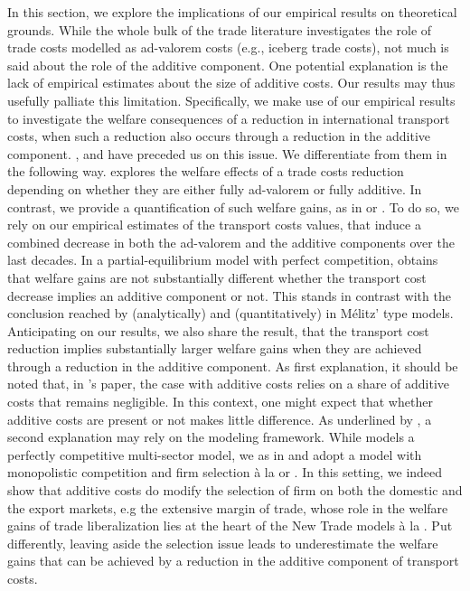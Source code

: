 \documentclass[a4paper,11pt]{article}
\begin{document}
In this section, we explore the implications of our empirical results on theoretical grounds. While the whole bulk of the trade literature investigates the role of trade costs modelled as ad-valorem costs (e.g., iceberg trade costs), not much is said about the role of the additive component. One potential explanation is the lack of empirical estimates about the size of additive costs. Our results may thus usefully palliate this limitation. Specifically, we make use of our empirical results to investigate the welfare consequences of a reduction in international transport costs, when such a reduction also occurs through a reduction in the additive component. \cite{Irrazabal_2015}, \cite{sorensen2014} and \cite{Lashkaripour_JIE2020} have preceded us on this issue. We differentiate from them in the following way. \cite{sorensen2014} explores the welfare effects of a trade costs reduction depending on whether they are either fully ad-valorem or fully additive. In contrast, we provide a quantification of such welfare gains, as in \cite{Irrazabal_2015} or \cite{Lashkaripour_JIE2020}. To do so, we rely on our empirical estimates of the transport costs values, that induce a combined decrease in both the ad-valorem and the additive components over the last decades. In a partial-equilibrium model with perfect competition, \cite{Lashkaripour_JIE2020} obtains that welfare gains are not substantially different whether the transport cost decrease implies an additive component or not. This stands in contrast with the conclusion reached by \cite{sorensen2014} (analytically) and \cite{Irrazabal_2015} (quantitatively) in M\'{e}litz' type models. Anticipating on our results, we also share the result, that the transport cost reduction implies substantially larger welfare gains when they are achieved through a reduction in the additive component. As first explanation, it should be noted that, in \cite{Lashkaripour_JIE2020}'s paper, the case with additive costs relies on a share of additive costs that remains negligible. In this context, one might expect that whether additive costs are present or not makes little difference. As underlined by \cite{Lashkaripour_JIE2020}, a second explanation may rely on the modeling framework. While \cite{Lashkaripour_JIE2020} models a perfectly competitive multi-sector model, we as in \cite{sorensen2014} and \cite{Irrazabal_2015} adopt a model with monopolistic competition and firm selection \`{a} la \cite{melitz} or \cite{chaney2008}. In this setting, we indeed show that additive costs do modify the selection of firm on both the domestic and the export markets, e.g the extensive margin of trade, whose role in the welfare gains of trade liberalization lies at the heart of the New Trade models  \`{a} la \cite{melitz}. Put differently, leaving aside the selection issue leads to underestimate the welfare gains that can be achieved by a reduction in the additive component of transport costs.
\end{document}
